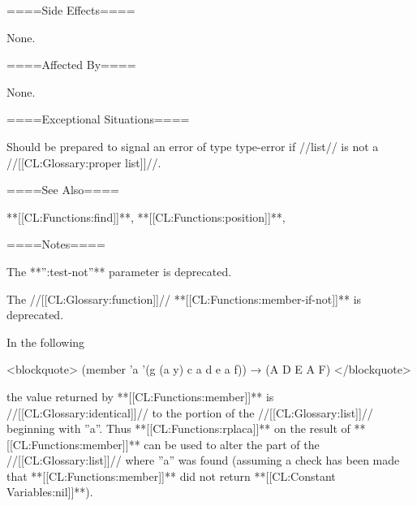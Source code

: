 ====Side Effects====

None.

====Affected By====

None.

====Exceptional Situations====

Should be prepared to signal an error of type type-error if //list// is not a //[[CL:Glossary:proper list]]//.

====See Also====

**[[CL:Functions:find]]**, **[[CL:Functions:position]]**,

{\secref\TraversalRules}

====Notes====

The **'':test-not''** parameter is deprecated.

The //[[CL:Glossary:function]]// **[[CL:Functions:member-if-not]]** is deprecated.

In the following

<blockquote> (member 'a '(g (a y) c a d e a f)) → (A D E A F) </blockquote>

the value returned by **[[CL:Functions:member]]** is //[[CL:Glossary:identical]]// to the portion of the //[[CL:Glossary:list]]// beginning with ''a''. Thus **[[CL:Functions:rplaca]]** on the result of **[[CL:Functions:member]]** can be used to alter the part of the //[[CL:Glossary:list]]// where ''a'' was found (assuming a check has been made that **[[CL:Functions:member]]** did not return **[[CL:Constant Variables:nil]]**).

  
